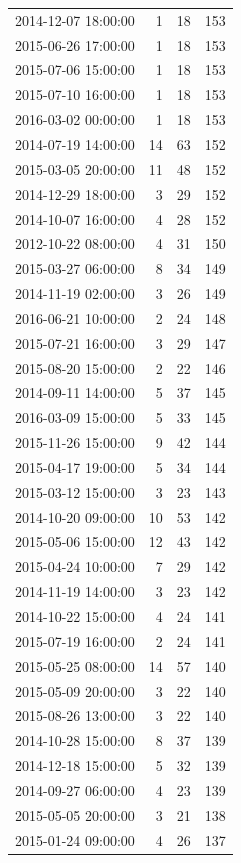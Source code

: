 \begin{tabular}{lrrr}
2014-12-07 18:00:00 & 1 & 18 & 153 \\
2015-06-26 17:00:00 & 1 & 18 & 153 \\
2015-07-06 15:00:00 & 1 & 18 & 153 \\
2015-07-10 16:00:00 & 1 & 18 & 153 \\
2016-03-02 00:00:00 & 1 & 18 & 153 \\
2014-07-19 14:00:00 & 14 & 63 & 152 \\
2015-03-05 20:00:00 & 11 & 48 & 152 \\
2014-12-29 18:00:00 & 3 & 29 & 152 \\
2014-10-07 16:00:00 & 4 & 28 & 152 \\
2012-10-22 08:00:00 & 4 & 31 & 150 \\
2015-03-27 06:00:00 & 8 & 34 & 149 \\
2014-11-19 02:00:00 & 3 & 26 & 149 \\
2016-06-21 10:00:00 & 2 & 24 & 148 \\
2015-07-21 16:00:00 & 3 & 29 & 147 \\
2015-08-20 15:00:00 & 2 & 22 & 146 \\
2014-09-11 14:00:00 & 5 & 37 & 145 \\
2016-03-09 15:00:00 & 5 & 33 & 145 \\
2015-11-26 15:00:00 & 9 & 42 & 144 \\
2015-04-17 19:00:00 & 5 & 34 & 144 \\
2015-03-12 15:00:00 & 3 & 23 & 143 \\
2014-10-20 09:00:00 & 10 & 53 & 142 \\
2015-05-06 15:00:00 & 12 & 43 & 142 \\
2015-04-24 10:00:00 & 7 & 29 & 142 \\
2014-11-19 14:00:00 & 3 & 23 & 142 \\
2014-10-22 15:00:00 & 4 & 24 & 141 \\
2015-07-19 16:00:00 & 2 & 24 & 141 \\
2015-05-25 08:00:00 & 14 & 57 & 140 \\
2015-05-09 20:00:00 & 3 & 22 & 140 \\
2015-08-26 13:00:00 & 3 & 22 & 140 \\
2014-10-28 15:00:00 & 8 & 37 & 139 \\
2014-12-18 15:00:00 & 5 & 32 & 139 \\
2014-09-27 06:00:00 & 4 & 23 & 139 \\
2015-05-05 20:00:00 & 3 & 21 & 138 \\
2015-01-24 09:00:00 & 4 & 26 & 137 \\

\end{tabular}
